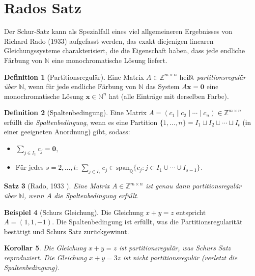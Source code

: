 \documentclass[12pt,a4paper]{amsart}
\newtheorem{theorem}{Satz}[section]
\newtheorem{corollary}[theorem]{Korollar}
\theoremstyle{definition}
\newtheorem{definition}[theorem]{Definition}
\newtheorem{example}[theorem]{Beispiel}
\newcommand{\N}{\mathbb{N}}
\newcommand{\Z}{\mathbb{Z}}
\newcommand{\Q}{\mathbb{Q}}
\begin{document}
\section{Rados Satz}\label{sec:rado}

Der Schur-Satz kann als Spezialfall eines viel allgemeineren Ergebnisses von Richard Rado
(1933) \cite{Rado1933} aufgefasst werden, das exakt diejenigen linearen Gleichungssysteme
charakterisiert, die die Eigenschaft haben, dass jede endliche Färbung von $\N$ eine
monochromatische Lösung liefert.

\begin{definition}[Partitionsregulär]
Eine Matrix $A \in \Z^{m \times n}$ heißt \emph{partitionsregulär über $\N$}, wenn
für jede endliche Färbung von $\N$ das System $A\mathbf{x} = \mathbf{0}$ eine
monochromatische Lösung $\mathbf{x} \in \N^n$ hat (alle Einträge mit derselben Farbe).
\end{definition}

\begin{definition}[Spaltenbedingung]
Eine Matrix $A = (c_1 \mid c_2 \mid \cdots \mid c_n) \in \Z^{m \times n}$ erfüllt die
\emph{Spaltenbedingung}, wenn es eine Partition $\{1,\ldots,n\} = I_1 \sqcup I_2 \sqcup
\cdots \sqcup I_t$ (in einer geeigneten Anordnung) gibt, sodass:
\begin{itemize}
\item $\sum_{j \in I_1} c_j = \mathbf{0}$,
\item Für jedes $s = 2, \ldots, t$: $\sum_{j \in I_s} c_j \in \mathrm{span}_\Q\{c_j : j \in I_1 \cup \cdots \cup I_{s-1}\}$.
\end{itemize}
\end{definition}

\begin{theorem}[Rado, 1933 \cite{Rado1933}]\label{satz:rado}
Eine Matrix $A \in \Z^{m \times n}$ ist genau dann partitionsregulär über $\N$, wenn
$A$ die Spaltenbedingung erfüllt.
\end{theorem}

\begin{example}[Schurs Gleichung]
Die Gleichung $x + y = z$ entspricht $A = (1, 1, -1)$. Die Spaltenbedingung ist
erfüllt, was die Partitionsregularität bestätigt und Schurs Satz zurückgewinnt.
\end{example}

\begin{corollary}
Die Gleichung $x + y = z$ ist partitionsregulär, was Schurs Satz reproduziert.
Die Gleichung $x + y = 3z$ ist \emph{nicht} partitionsregulär (verletzt die
Spaltenbedingung).
\end{corollary}
\end{document}
